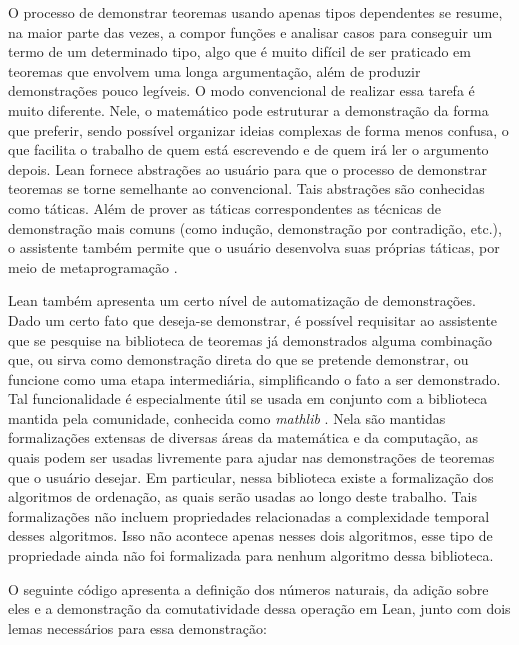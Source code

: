\documentclass[12pt, oneside, a4paper,english,brazil]{abntex2}
\begin{document}
\qquad O processo de demonstrar teoremas usando apenas tipos dependentes se resume, na maior parte das vezes, a
compor fun\c{c}\~oes e analisar casos para conseguir um termo de um determinado tipo, algo que \'e muito dif\'icil
de ser praticado em teoremas que envolvem uma longa argumenta\c{c}\~ao, al\'em de produzir demonstra\c{c}\~oes
pouco leg\'iveis. O modo convencional de realizar essa tarefa \'e muito diferente. Nele,
o matem\'atico pode estruturar a demonstra\c{c}\~ao da forma que preferir, sendo poss\'ivel organizar
ideias complexas de forma menos confusa, o que facilita o trabalho de quem est\'a escrevendo e de quem ir\'a
ler o argumento depois.
Lean fornece abstra\c{c}\~oes ao usu\'ario para que o processo de demonstrar teoremas se torne semelhante ao
convencional. Tais abstra\c{c}\~oes s\~ao conhecidas como t\'aticas. Al\'em de prover as t\'aticas
correspondentes as t\'ecnicas de demonstra\c{c}\~ao mais comuns (como indu\c{c}\~ao, demonstra\c{c}\~ao por
contradi\c{c}\~ao, etc.), o assistente tamb\'em permite que o usu\'ario desenvolva suas pr\'oprias t\'aticas, por
meio de metaprograma\c{c}\~ao \cite{metaprog}.

\qquad Lean tamb\'em apresenta um certo n\'ivel de automatiza\c{c}\~ao de demonstra\c{c}\~oes. Dado um certo fato
que deseja-se demonstrar, \'e poss\'ivel requisitar ao assistente que se pesquise na biblioteca de teoremas j\'a
demonstrados alguma combina\c{c}\~ao que, ou sirva como demonstra\c{c}\~ao direta do que se pretende demonstrar,
ou funcione como uma etapa intermedi\'aria, simplificando o fato a ser demonstrado. Tal funcionalidade \'e
especialmente \'util se usada em conjunto com a biblioteca mantida pela comunidade, conhecida como
\textit{mathlib} \cite{3}. Nela s\~ao mantidas formaliza\c{c}\~oes extensas de diversas \'areas da matem\'atica e da
computa\c{c}\~ao, as quais podem ser usadas livremente para ajudar nas demonstra\c{c}\~oes de teoremas que o
usu\'ario desejar. Em particular, nessa biblioteca existe a formaliza\c{c}\~ao dos algoritmos de ordena\c{c}\~ao,
as quais ser\~ao usadas ao longo deste trabalho. Tais formaliza\c{c}\~oes
n\~ao incluem propriedades relacionadas a complexidade temporal desses algoritmos. Isso n\~ao acontece
apenas nesses dois algoritmos,
esse tipo de propriedade ainda n\~ao foi formalizada para nenhum algoritmo dessa biblioteca.

\qquad O seguinte c\'odigo apresenta a defini\c{c}\~ao dos n\'umeros naturais, da adi\c{c}\~ao sobre eles e a
demonstra\c{c}\~ao da comutatividade dessa opera\c{c}\~ao em Lean, junto com dois lemas necess\'arios para essa
demonstra\c{c}\~ao:
\end{document}
